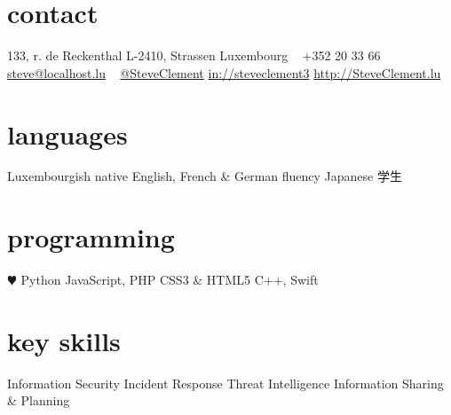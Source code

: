 \documentclass[a4paper]{friggeri-cv} %
\begin{document}


\begin{aside} %
\section{contact}
\pin \hfill 133, r. de Reckenthal
L-2410, Strassen
Luxembourg
~
{\Large\textcolor{gray}{\Mobilefone}} \hfill +352 20 33 66
{\Large\textcolor{gray}{\Letter}}\hfill\href{mailto:steve@localhost.lu}{steve@localhost.lu}
~
\tlogo \hfill \href{http://twitter.com/johnsmith}{@SteveClement}
\llogo \hfill \href{http://linkedin.com/johnsmith}{in://steveclement3}
\href{http://SteveClement.lu}{http://SteveClement.lu}
\section{languages}
Luxembourgish native
English, French \& German fluency
Japanese 学生
\section{programming}
{\color{red} $\varheartsuit$} Python
JavaScript, PHP
CSS3 \& HTML5
C++, Swift
\section{key skills}
Information Security
Incident Response
Threat Intelligence
Information Sharing \& Planning
\end{aside}

\end{document}
